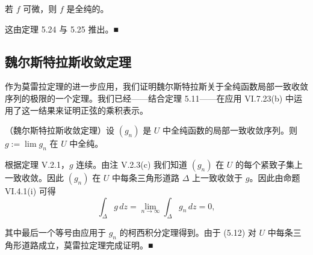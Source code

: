 \begin{corollary}

若 $ f $ 可微，则 $ f $ 是全纯的。

\proofhead
这由定理 5.24 与 5.25 推出。\nobreak\hspace{0.35em}■
\end{corollary}

\subsection*{魏尔斯特拉斯收敛定理}

作为莫雷拉定理的进一步应用，我们证明魏尔斯特拉斯关于全纯函数局部一致收敛序列的极限的一个定理。我们已经——结合定理 5.11——在应用 VI.7.23(b) 中运用了这一结果来证明正弦的乘积表示。

\begin{theorem}

（魏尔斯特拉斯收敛定理）设 $ (g_{n}) $ 是 $ U $ 中全纯函数的局部一致收敛序列。则 $ g := \lim g_{n} $ 在 $ U $ 中全纯。

\proofhead
根据定理 V.2.1，$ g $ 连续。由注 V.2.3(c) 我们知道 $ (g_{n}) $ 在 $ U $ 的每个紧致子集上一致收敛。因此 $ (g_{n}) $ 在 $ U $ 中每条三角形道路 $ \Delta $ 上一致收敛于 $ g $。因此由命题 VI.4.1(i) 可得
\begin{equation}
\int_{\Delta} g\,dz = \lim_{n\to\infty}\int_{\Delta} g_{n}\,dz = 0 ,\tag{5.12}
\end{equation}

其中最后一个等号由应用于 $ g_{n} $ 的柯西积分定理得到。由于 (5.12) 对 $ U $ 中每条三角形道路成立，莫雷拉定理完成证明。\nobreak\hspace{0.35em}■

\end{theorem}

\exerciseshead

